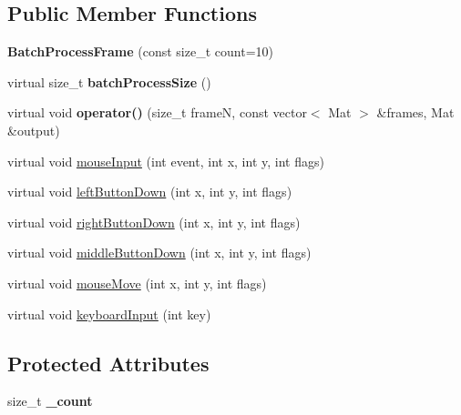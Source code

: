 \subsection*{Public Member Functions}
\begin{DoxyCompactItemize}
\item 
{\bfseries Batch\+Process\+Frame} (const size\+\_\+t count=10)\hypertarget{classviva_1_1_batch_process_frame_a126f3b1c309eaeac244b761df7d921c0}{}\label{classviva_1_1_batch_process_frame_a126f3b1c309eaeac244b761df7d921c0}

\item 
virtual size\+\_\+t {\bfseries batch\+Process\+Size} ()\hypertarget{classviva_1_1_batch_process_frame_a1c9c59bc1d59d62e890271867ba23321}{}\label{classviva_1_1_batch_process_frame_a1c9c59bc1d59d62e890271867ba23321}

\item 
virtual void {\bfseries operator()} (size\+\_\+t frameN, const vector$<$ Mat $>$ \&frames, Mat \&output)\hypertarget{classviva_1_1_batch_process_frame_acfcb93fe2954cb748bc7c436864a8e49}{}\label{classviva_1_1_batch_process_frame_acfcb93fe2954cb748bc7c436864a8e49}

\item 
virtual void \hyperlink{classviva_1_1_batch_process_frame_a70b9f91a0d9fadb04ec4db3df7fbd2a8}{mouse\+Input} (int event, int x, int y, int flags)
\item 
virtual void \hyperlink{classviva_1_1_batch_process_frame_a7b4b1dbd173e0d900e7d1461c373fdad}{left\+Button\+Down} (int x, int y, int flags)
\item 
virtual void \hyperlink{classviva_1_1_batch_process_frame_ab7b8be0c726713cbf8be004ed9974ec6}{right\+Button\+Down} (int x, int y, int flags)
\item 
virtual void \hyperlink{classviva_1_1_batch_process_frame_a34fc0aff605d24a0260f466cd386c091}{middle\+Button\+Down} (int x, int y, int flags)
\item 
virtual void \hyperlink{classviva_1_1_batch_process_frame_afaf81db14d5a7f6f97c766498c9b66c9}{mouse\+Move} (int x, int y, int flags)
\item 
virtual void \hyperlink{classviva_1_1_batch_process_frame_a956265d099d3b4f4305045bfccceb308}{keyboard\+Input} (int key)
\end{DoxyCompactItemize}
\subsection*{Protected Attributes}
\begin{DoxyCompactItemize}
\item 
size\+\_\+t {\bfseries \+\_\+count}\hypertarget{classviva_1_1_batch_process_frame_ac0c401ebf80e5346d0e376279eb46c3f}{}\label{classviva_1_1_batch_process_frame_ac0c401ebf80e5346d0e376279eb46c3f}

\end{DoxyCompactItemize}


